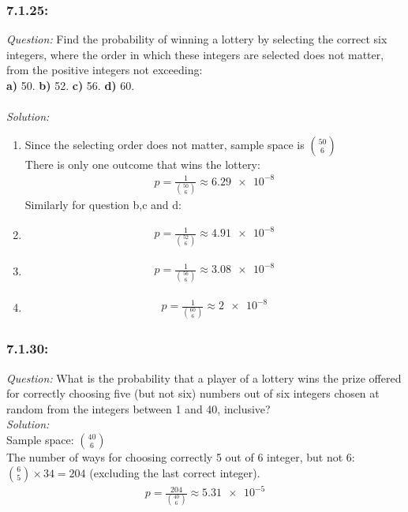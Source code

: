 \documentclass[a4paper]{article}
\begin{document}
	\subsubsection*{7.1.25:}
	\textit{Question:} Find the probability of winning a lottery by selecting the correct six integers, where the order in which these integers are selected does not matter, from the positive integers not exceeding: \\
	\textbf{a)} 50. \textbf{b)} 52. \textbf{c)} 56. \textbf{d)} 60. \\ \\
	\textit{Solution:}
	\begin{enumerate}[label = (\alph*)]
		\item Since the selecting order does not matter, sample space is ${50 \choose 6}$\\
		There is only one outcome that wins the lottery:
		\begin{align*}
		p  = \frac{1}{{50 \choose 6}} \approx \num{6.29e-8}
		\end{align*}
		Similarly for question b,c and d:\\
		\item 
		\begin{align*}
		p  = \frac{1}{{52 \choose 6}} \approx \num{4.91e-8}
		\end{align*}
		\item 
		\begin{align*}
		p  = \frac{1}{{56 \choose 6}} \approx \num{3.08e-8}
		\end{align*}
		\item 
		\begin{align*}
		p  = \frac{1}{{60 \choose 6}} \approx \num{2e-8}
		\end{align*}
	\end{enumerate}
	
	\subsubsection*{7.1.30:}
	\textit{Question:} What is the probability that a player of a lottery wins the prize offered for correctly choosing five (but not six) numbers out of six integers chosen at random from the integers between 1 and 40, inclusive? \\
	\textit{Solution:} \\
	Sample space: ${40 \choose 6}$ \\
	The number of ways for choosing correctly 5 out of 6 integer, but not 6: ${6 \choose 5} \times 34 = 204$ (excluding the last correct integer).
	\begin{align*}
	p = \frac{204}{{40 \choose 6}} \approx \num{5.31e-5}
	\end{align*}
	
\end{document}
